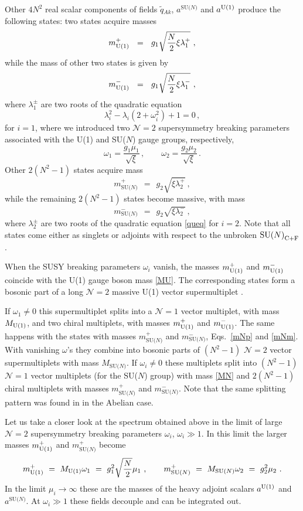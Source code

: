 \documentclass[12pt]{article}
\def\beq{\begin{equation}}
\def\eeq{\end{equation}}
\newcommand{\ntwo}{${\mathcal N}=2$ }
\newcommand{\none}{${\mathcal N}=1$ }
\newcommand{\wt}{\widetilde}
\def\cfl {$\text{SU($N$)}_{\rm C+F}$ }
\newcommand{\mUp}{m_{\rm U(1)}^{+}}
\newcommand{\mUm}{m_{\rm U(1)}^{-}}
\newcommand{\mNp}{m_\text{SU($N$)}^{+}}
\newcommand{\mNm}{m_\text{SU($N$)}^{-}}
\newcommand{\aU}{a^{\rm U(1)}}
\newcommand{\aN}{a^\text{SU($N$)}}
\newcommand{\MN}{M_\text{SU($N$)}}
\newcommand{\MU}{M_{\rm U(1)}}
\begin{document}
	Other $ 4 N^2 $ real scalar components of fields $ \wt{q}{}_{Ak} $, $\aN$ and $\aU$ produce the
	following states: 
	two states acquire masses
\beq
\label{mUp}
	\mUp ~~=~~ g_1 \sqrt{\frac{N}{2}\xi\lambda_1^+}~,
\eeq
	while the mass of other two states is given by
\beq
\label{mUm}
	\mUm ~~=~~ g_1 \sqrt{\frac{N}{2}\xi\lambda_1^-}~,
\eeq
	where $ \lambda_1^\pm $ are two roots of the quadratic equation
\beq
	\lambda_i^2  -  \lambda_i(2 + \omega^2_i)  +   1  =  0\,,
\label{queq}
\eeq
	for $i =1$, where we introduced two \ntwo supersymmetry breaking parameters associated
	with the U(1) and SU($N$) gauge groups, respectively,
\beq
	\omega_1  =  \frac{g_1\mu_1}{\sqrt{\xi}}\,,\qquad
	\omega_2  =  \frac{g_2\mu_2}{\sqrt{\xi}}\,.
\label{omega}
\eeq
	Other $ 2(N^2 - 1) $ states acquire mass
\beq
\label{mNp}
	\mNp ~~=~~ g_2 \sqrt{\xi\lambda_2^+} ~,
\eeq
	while the remaining $ 2(N^2 - 1) $ states become massive, with mass
\beq
\label{mNm}
	\mNm ~~=~~ g_2 \sqrt{\xi\lambda_2^-} ~,
\eeq
	where $ \lambda_2^\pm $ are two roots of the quadratic equation \eqref{queq} for $ i = 2 $.
	Note that all states come either as singlets or adjoints with respect to the unbroken
	\cfl.

	When the SUSY breaking parameters $ \omega_i $ vanish, the masses $ \mUp $ and $ \mUm $
	coincide with the U(1) gauge boson mass \eqref{MU}.
	The corresponding states form a bosonic part of a long \ntwo massive U(1) vector supermultiplet
	\cite{VY}.	

	If $\omega_1 \neq 0 $ this supermultiplet splits into a \none vector multiplet, with mass $ \MU $,
	and two chiral multiplets, with masses $ \mUp $ and $ \mUm $. 
	The same happens with the states with masses $ \mNp $ and $ \mNm $, Eqs.~\eqref{mNp} and \eqref{mNm}.
	With vanishing $ \omega $'s they combine into bosonic parts of $ (N^2 - 1) $ \ntwo vector supermultiplets
	with mass $ \MN $.
	If $ \omega_i \neq 0 $ these multiplets split into $ (N^2 - 1) $ \none vector multiplets (for the 
	SU($N$) group) with mass \eqref{MN} and $ 2(N^2 - 1) $ chiral multiplets with masses 
	$ \mNp $ and $ \mNm $.
	Note that the same splitting pattern was found in \cite{VY} in the Abelian case.

	Let us take a closer look at the spectrum obtained above in the limit of large \ntwo supersymmetry 
	breaking parameters $\omega_i$, $\omega_i \gg 1 $.
	In this limit the larger masses $ \mUp $ and $\mNp$ become
\beq
\label{amass}
	\mUp ~=~ \MU \omega_1 ~=~ g_1^2\sqrt{\frac{N}{2}}\mu_1 ~,
	\qquad
	\mNp ~=~ \MN \omega_2 ~=~ g_2^2 \mu_2~.
\eeq
	In the limit $\mu_i \to \infty$ these are the masses of the heavy adjoint scalars $ \aU $ and
	$ \aN $.
	At $ \omega_i \gg 1 $ these fields decouple and can be integrated out.
\end{document}
